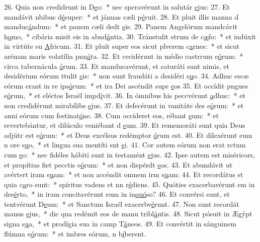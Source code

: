 26. Quia non credidrunt in D\uline{e}o:~* nec speravérunt in salutár \uline{e}jus:
27. Et mandávit nbibus d\uline{é}super:~* et jánuas cæli p\uline{é}ruit.
28. Et pluit illis manna d manduc\uline{á}ndum:~* et panem cæli dedt \uline{e}is.
29. Panem Angelórum mandcávit h\uline{o}mo,~* cibária misit eis in abnd\uline{á}ntia.
30. Tránstulit strum de c\uline{æ}lo:~* et indúxit in virtúte su \uline{A}fricum.
31. Et pluit super eos sicut plverem c\uline{a}rnes:~* et sicut arénam maris volatília pnn\uline{á}ta.
32. Et cecidérunt in médio castrrum e\uline{ó}rum:~* circa tabernácula \uline{ó}rum.
33. Et manducavérunt, et saturáti sunt nimis, et desidérium eórum ttulit \uline{e}is:~* non sunt fraudáti a desidéri s\uline{u}o.
34. Adhuc escæ eórum erant in re ips\uline{ó}rum:~* et ira Dei ascéndit supr \uline{e}os
35. Et occídit pngues e\uline{ó}rum,~* et eléctos Israël impd\uline{í}vit.
36. In ómnibus his peccvérunt \uline{a}dhuc:~* et non credidérunt mirabílibs \uline{e}jus.
37. Et defecérunt in vanitáte des e\uline{ó}rum:~* et anni eórum cum festinat\uline{ó}ne.
38. Cum occíderet eos, rébant \uline{e}um:~* et revertebántur, et dilúculo veniébant d \uline{e}um.
39. Et rememoráti sunt quia Deus adjútr est e\uline{ó}rum:~* et Deus excélsus redémptor \uline{ó}rum est.
40. Et dilexérunt eum n ore s\uline{u}o,~* et lingua sua mentíti snt \uline{e}i.
41. Cor autem eórum non erat rctum cum \uline{e}o:~* nec fidéles hábiti sunt in testamént \uline{e}jus.
42. Ipse autem est miséricors, et propítius fiet pecctis e\uline{ó}rum:~* et non dispérdt \uline{e}os.
43. Et abundávit ut avértert iram s\uline{u}am:~* et non accéndit omnem irm s\uline{u}am:
44. Et recordátus st quia c\uline{a}ro sunt:~* spíritus vadens et nn r\uline{é}diens.
45. Quóties exacerbavérunt em in des\uline{é}rto,~* in iram concitavérunt eum in in\uline{quó}so?
46. Et convérsi sunt, et tentvérunt D\uline{e}um:~* et Sanctum Israël exacerbv\uline{é}runt.
47. Non sunt recordát manus \uline{e}jus,~* die qua redémit eos de manu tribl\uline{á}ntis.
48. Sicut pósuit in Ægýpt signa s\uline{u}a,~* et prodígia sua in camp T\uline{á}neos.
49. Et convértit in sánguinem flúmna e\uline{ó}rum:~* et imbres eórum, n b\uline{í}berent.
